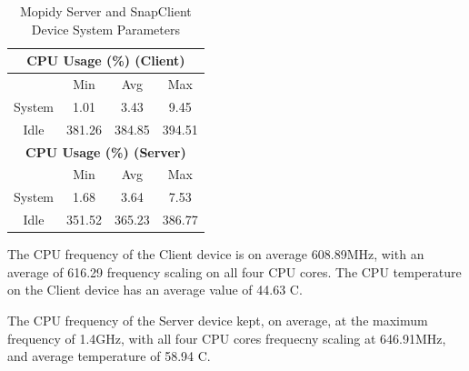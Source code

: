 \documentclass[11pt,a4paper]{scrreprt}
\begin{document}
\begin{table}[H]
\begin{tabular}{||c|c|c|c|c|c|c||}
    \multicolumn{7}{|c|}{\textbf{CPU Usage (\%) (Client)}} \\
    \hline\hline
      & \multicolumn{2}{|c|}{Min} & \multicolumn{2}{|c|}{Avg} & \multicolumn{2}{|c|}{Max} \\
    \hline
    System & \multicolumn{2}{|c|}{1.01} & \multicolumn{2}{|c|}{3.43} & \multicolumn{2}{|c|}{9.45} \\
    \hline
    Idle & \multicolumn{2}{|c|}{381.26} & \multicolumn{2}{|c|}{384.85} & \multicolumn{2}{|c|}{394.51} \\
    \hline\hline
    \multicolumn{7}{|c|}{\textbf{CPU Usage (\%) (Server)}} \\
    \hline\hline
      & \multicolumn{2}{|c|}{Min} & \multicolumn{2}{|c|}{Avg} & \multicolumn{2}{|c|}{Max} \\
    \hline
    System & \multicolumn{2}{|c|}{1.68} & \multicolumn{2}{|c|}{3.64} & \multicolumn{2}{|c|}{7.53} \\
    \hline
    Idle & \multicolumn{2}{|c|}{351.52} & \multicolumn{2}{|c|}{365.23} & \multicolumn{2}{|c|}{386.77} \\
    \hline\hline
    \end{tabular}
    \caption{Mopidy Server and SnapClient Device System Parameters}
    \label{MopidyclientserverSysTab}
\end{table}

The CPU frequency of the Client device is on average 608.89MHz, with an
average of 616.29 frequency scaling on all four CPU cores. The CPU
temperature on the Client device has an average value of 44.63
\degree C.

The CPU frequency of the Server device kept, on average, at the maximum
frequency of 1.4GHz, with all four CPU cores frequecny scaling at
646.91MHz, and average temperature of 58.94 \degree C.
\end{document}

